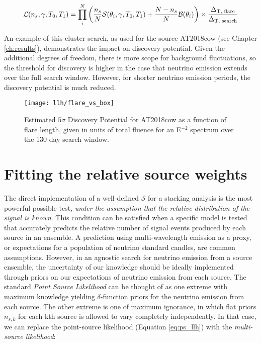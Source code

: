\begin{equation}
\mathcal{L}(n_{s}, \gamma, T_{0}, T_{1}) = \prod_{i}^{N} \left(\frac{n_{s}}{N} \mathcal{S}(\theta_{i}, \gamma, T_{0}, T_{1}) + \frac{N - n_{s}}{N} \mathcal{B}(\theta_{i})  \right) \times \frac{\Delta_{\textup{T, flare}}}{\Delta_{\textup{T, search}}}
\end{equation}

An example of this cluster search, as used for the source AT2018cow (see Chapter \ref{ch:results}), demonstrates the impact on discovery potential. Given the additional degrees of freedom, there is more scope for background fluctuations, so the threshold for discovery is higher in the case that neutrino emission extends over the full search window. However, for shorter neutrino emission periods, the discovery potential is much reduced.

\begin{figure}[!ht]
	\centering \texttt{[image: llh/flare\_vs\_box]}
	\caption{Estimated $5\sigma$ Discovery Potential for AT2018cow as a function of flare length, given in units of total fluence for an E$^{-2}$ spectrum over the 130 day search window.}
	\label{fig:DiscTime}
\end{figure}

\section{Fitting the relative source weights}
\label{sec:fit_weights}

The direct implementation of a well-defined $\mathcal{S}$ for a stacking analysis is the most powerful possible test, \emph{under the assumption that the relative distribution of the signal is known}. This condition can be satisfied when a specific model is tested that accurately predicts the relative number of signal events produced by each source in an ensemble. A prediction using multi-wavelength emission as a proxy, or expectations for a population of neutrino standard candles, are common assumptions. However, in an agnostic search for neutrino emission from a source ensemble, the uncertainty of our knowledge should be ideally implemented through priors on our expectations of neutrino emission from each source. The standard \emph{Point Source Likelihood} can be thought of as one extreme with maximum knowledge yielding $\delta$-function priors for the neutrino emission from each source. The other extreme is one of maximum ignorance, in which flat priors $n_{s, k}$ for each kth source is allowed to vary completely independently. In that case, we can replace the point-source likelihood (Equation \ref{eq:ps_llh}) with the \emph{multi-source likelihood}:

